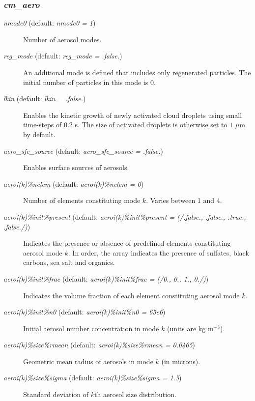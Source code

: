 \documentclass[12pt,A4,french]{article}
\begin{document}
\subsubsection{{\it cm\_aero}}

\begin{description}

\item[{\it nmode0} (default: {\it nmode0 = 1})]

Number of aerosol modes.

\item[{\it reg\_mode} (default: {\it reg\_mode = .false.})]

An additional mode is defined that includes only regenerated particles. The initial number of particles in this mode is 0.

\item[{\it lkin} (default: {\it lkin = .false.})]

Enables the kinetic growth of newly activated cloud droplets using small time-steps of 0.2 s. The size of activated droplets is otherwise set to $1$ $\mu$m by default.

\item[{\it aero\_sfc\_source} (default: {\it aero\_sfc\_source = .false.})]

Enables surface sources of aerosols.

\item[{\it aeroi(k)\%nelem} (default: {\it aeroi(k)\%nelem = 0})]

Number of elements constituting mode $k$. Varies between 1 and 4.

\item[{\it aeroi(k)\%init\%present} (default: {\it aeroi(k)\%init\%present = (/.false., .false., .true., .false./)})]

Indicates the presence or absence of predefined elements constituting aerosol mode $k$. In order, the array indicates the presence of sulfates, black carbons, sea salt and organics.

\item[{\it aeroi(k)\%init\%frac} (default: {\it aeroi(k)\%init\%frac = (/0., 0., 1., 0./)})]

Indicates the volume fraction of each element constituting aerosol mode $k$.

\item[{\it aeroi(k)\%init\%n0} (default: {\it aeroi(k)\%init\%n0 = 65e6})]

Initial aerosol number concentration in mode $k$ (units are kg m$^{-3}$).

\item[{\it aeroi(k)\%size\%rmean} (default: {\it aeroi(k)\%size\%rmean = 0.0465})]

Geometric mean radius of aerosols in mode $k$ (in microns).

\item[{\it aeroi(k)\%size\%sigma} (default: {\it aeroi(k)\%size\%sigma = 1.5})]

Standard deviation of $k$th aerosol size distribution.

\end{description}
\end{document}
